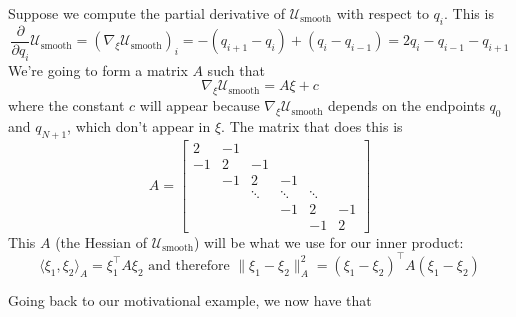 \documentclass[twoside]{article}
\newcommand{\cus}{\mathcal{U}_\text{smooth}}
\begin{document}
Suppose we compute the partial derivative of $\cus$ with respect to $q_i$. This is
\begin{equation}
  \label{eq:13}
  \frac{\partial}{\partial q_i}\cus = (\nabla_{\xi}\cus)_i = - (q_{i+1} - q_i) + (q_i - q_{i-1}) = 2q_i - q_{i-1} - q_{i+1}
\end{equation}
We're going to form a matrix $A$ such that
\begin{equation}
  \label{eq:14}
  \nabla_{\xi}\cus = A \xi + c
\end{equation}
where the constant $c$ will appear because $\nabla_\xi \cus$ depends on the endpoints $q_0$ and $q_{N+1}$, which don't appear in $\xi$. The matrix that does this is
\begin{equation}
  \label{eq:15}
  A =
  \begin{bmatrix}
    2 & -1 & & & & \\
    -1 & 2 & -1 & & & \\
    & -1 & 2 & -1 & & \\
    & & \ddots & \ddots & \ddots &  \\
    & & & -1 & 2 & -1 \\
    & & & & -1 & 2
  \end{bmatrix}
\end{equation}
This $A$ (the Hessian of $\cus$) will be what we use for our inner product:
\begin{equation}
  \label{eq:16}
  \langle \xi_1, \xi_2 \rangle_A = \xi_1^\top A \xi_2 \text{ and therefore } \|\xi_1 - \xi_2\|_A^2 = (\xi_1 - \xi_2)^\top A (\xi_1 - \xi_2)
\end{equation}

Going back to our motivational example, we now have that
\end{document}

